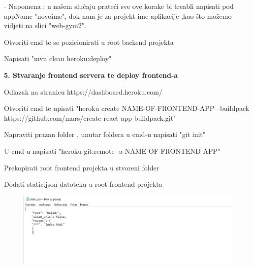 \begin{packed_item}
\begin{packed_enum}
                        		- Napomena : u našem slučaju prateći sve ove korake bi treabli napisati
                        		pod appName "novoime", dok nam je za projekt ime aplikacije ,kao što možemo vidjeti na slici "web-gym2".
							
							\item Otvoriti cmd te se pozicionirati u root backend projekta
							
							\item Napisati "mvn clean heroku:deploy"
						

						\end{packed_enum}
						
				\item  \textbf{5. Stvaranje frontend servera te deploy frontend-a}
				\item[] \begin{packed_enum}
	
							\item Odlazak na stranicu  https://dashboard.heroku.com/
							
							\item Otvoriti cmd te upisati "heroku create NAME-OF-FRONTEND-APP --buildpack https://github.com/mars/create-react-app-buildpack.git"

							\item Napraviti prazan folder , unutar foldera u cmd-u napisati "git init"
							
							\item U cmd-u napisati "heroku git:remote -a NAME-OF-FRONTEND-APP"
							
							\item Prekopirati root frontend projekta u stvoreni folder
							
							\item Dodati static.json datoteku u root frontend projekta
							    
							    \begin{figure}[H]
                        			\hspace*{-1.5cm}
                        			\includegraphics[scale=0.5]{slike/json.PNG} %
                        			\centering
                        			\label{fig:promjene}
                        		\end{figure}
							

\end{packed_enum}
\end{packed_item}
